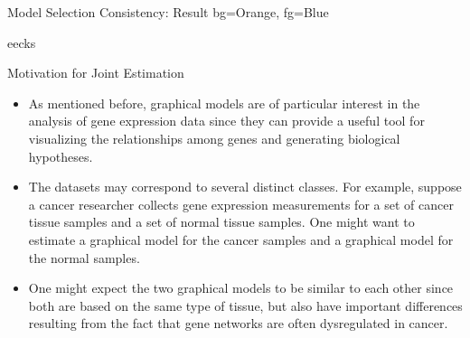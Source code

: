 \documentclass[xcolor=dvipsnames,aspectratio=1610]{beamer}
\theoremstyle{remark}
\begin{document}
\begin{frame}{Model Selection Consistency: Result}
   {bg=Orange, fg=Blue}
\vspace{.5in}
  \begin{beamercolorbox}[shadow=true, rounded=true]{eecks}
 \end{beamercolorbox}
\end{frame}

\begin{frame}{Motivation for Joint Estimation}
  \begin{itemize}
    \setlength{\itemsep}{10pt}
\item As mentioned before, graphical models are of particular interest in the analysis of gene expression data since they can provide a useful tool for visualizing the relationships among genes and generating biological hypotheses. 

\item The datasets may correspond to several distinct classes. For example, suppose a cancer researcher collects gene expression measurements for a set of cancer tissue samples and a set of normal tissue samples.  One might want to estimate a graphical model for the cancer samples and a graphical model for the normal samples.

\item One might expect the two graphical models to be similar to each other since both are based on the same type of tissue, but also have important differences resulting from the fact that gene networks are often dysregulated in cancer. 
  \end{itemize}
\end{frame}
\end{document}
